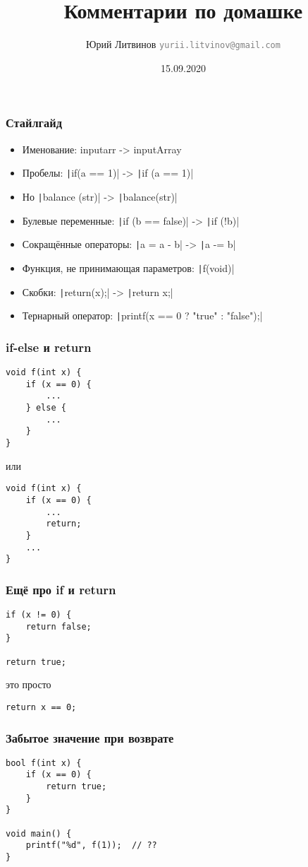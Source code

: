 \documentclass[xetex,mathserif,serif]{beamer}
\title{Комментарии по домашке}
\author[Юрий Литвинов]{Юрий Литвинов \newline \textcolor{gray}{\small\texttt{yurii.litvinov@gmail.com}}}
\date{15.09.2020}
\begin{document}
    
    \frame{\titlepage}
    
    \begin{frame}
        \frametitle{Стайлгайд}
        \begin{itemize}
            \item Именование: inputarr -> inputArray
            \item Пробелы: \texttt|if(a == 1)| -> \texttt|if (a == 1)|
            \item Но \texttt|balance (str)| -> \texttt|balance(str)|
            \item Булевые переменные: \texttt|if (b == false)| -> \texttt|if (!b)|
            \item Сокращённые операторы: \texttt|a = a - b| -> \texttt|a -= b|
            \item Функция, не принимающая параметров: \texttt|f(void)|
            \item Скобки: \texttt|return(x);| -> \texttt|return x;|
            \item Тернарный оператор: \texttt|printf(x == 0 ? "true" :  "false");|
        \end{itemize}
    \end{frame}

    \begin{frame}[fragile]
        \frametitle{if-else и return}
        \begin{verbatim}
void f(int x) {
    if (x == 0) {
        ...
    } else {
        ...
    }
}
        \end{verbatim}
        или
        \begin{verbatim}
void f(int x) {
    if (x == 0) {
        ...
        return;
    } 
    ...
}
        \end{verbatim}
    \end{frame}

    \begin{frame}[fragile]
        \frametitle{Ещё про if и return}
        \begin{verbatim}
if (x != 0) {
    return false;
}

return true;
        \end{verbatim}
        это просто
        \begin{verbatim}
return x == 0;
        \end{verbatim}
    \end{frame}

    \begin{frame}[fragile]
        \frametitle{Забытое значение при возврате}
        \begin{verbatim}
bool f(int x) {
    if (x == 0) {
        return true;
    }
}

void main() {
    printf("%d", f(1));  // ??
}
        \end{verbatim}
    \end{frame}
\end{document}
